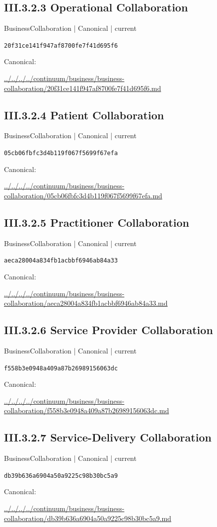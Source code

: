 \documentclass[10pt,a4paper]{article}
\begin{document}
\subsection*{III.3.2.3 Operational Collaboration}
{\small BusinessCollaboration | Canonical | current}\par
\texttt{20f31ce141f947af8700fe7f41d695f6}\par
Canonical: \par
{\footnotesize\url{../../../../continuum/business/business-collaboration/20f31ce141f947af8700fe7f41d695f6.md}}\par
\subsection*{III.3.2.4 Patient Collaboration}
{\small BusinessCollaboration | Canonical | current}\par
\texttt{05cb06fbfc3d4b119f067f5699f67efa}\par
Canonical: \par
{\footnotesize\url{../../../../continuum/business/business-collaboration/05cb06fbfc3d4b119f067f5699f67efa.md}}\par
\subsection*{III.3.2.5 Practitioner Collaboration}
{\small BusinessCollaboration | Canonical | current}\par
\texttt{aeca28004a834fb1acbbf6946ab84a33}\par
Canonical: \par
{\footnotesize\url{../../../../continuum/business/business-collaboration/aeca28004a834fb1acbbf6946ab84a33.md}}\par
\subsection*{III.3.2.6 Service Provider Collaboration}
{\small BusinessCollaboration | Canonical | current}\par
\texttt{f558b3e0948a409a87b26989156063dc}\par
Canonical: \par
{\footnotesize\url{../../../../continuum/business/business-collaboration/f558b3e0948a409a87b26989156063dc.md}}\par
\subsection*{III.3.2.7 Service-Delivery Collaboration}
{\small BusinessCollaboration | Canonical | current}\par
\texttt{db39b636a6904a50a9225c98b30bc5a9}\par
Canonical: \par
{\footnotesize\url{../../../../continuum/business/business-collaboration/db39b636a6904a50a9225c98b30bc5a9.md}}\par
\end{document}
